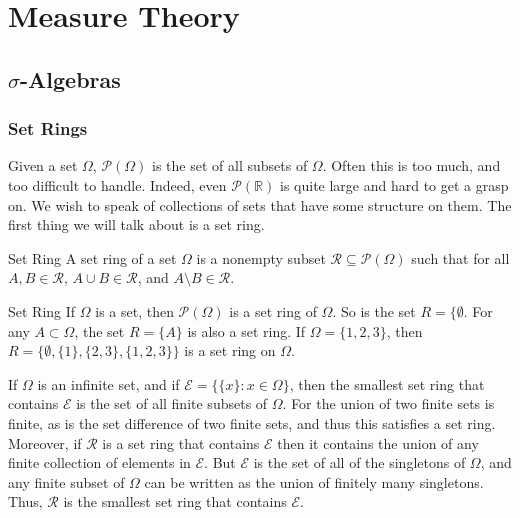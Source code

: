 \chapter{Measure Theory}
    \section{\texorpdfstring{$\sigma$}{Sigma}-Algebras}
        \subsection{Set Rings}
            Given a set $\Omega$, $\mathcal{P}(\Omega)$ is the
            set of all subsets of $\Omega$. Often this is too
            much, and too difficult to handle. Indeed, even
            $\mathcal{P}(\mathbb{R})$ is quite large and hard
            to get a grasp on. We wish to speak of collections
            of sets that have some structure on them.
            The first thing we will talk about is a set ring.
            \begin{ldefinition}{Set Ring}
                A set ring of a set $\Omega$ is a nonempty subset
                $\mathcal{R}\subseteq\mathcal{P}(\Omega)$ such that
                for all $A,B\in\mathcal{R}$,
                $A\cup{B}\in\mathcal{R}$, and
                $A\setminus{B}\in\mathcal{R}$.
            \end{ldefinition}
            \begin{example}{Set Ring}
                If $\Omega$ is a set, then
                $\mathcal{P}(\Omega)$ is a set ring of
                $\Omega$. So is the set $R=\{\emptyset$.
                For any $A\subset\Omega$, the set
                $R=\{A\}$ is also a set ring. If
                $\Omega=\{1,2,3\}$, then
                $R=\{\emptyset,\{1\},\{2,3\},\{1,2,3\}\}$ is
                a set ring on $\Omega$.
            \end{example}
            \begin{lexample}
                If $\Omega$ is an infinite set, and if
                $\mathcal{E}=\big\{\{x\}:x\in\Omega\big\}$, then the
                smallest set ring that contains $\mathcal{E}$ is the set of
                all finite subsets of $\Omega$. For the union of two finite
                sets is finite, as is the set difference of two finite sets,
                and thus this satisfies a set ring. Moreover, if $\mathcal{R}$
                is a set ring that contains $\mathcal{E}$ then it contains the
                union of any finite collection of elements in $\mathcal{E}$.
                But $\mathcal{E}$ is the set of all of the singletons of
                $\Omega$, and any finite subset of $\Omega$ can be written
                as the union of finitely many singletons. Thus, $\mathcal{R}$
                is the smallest set ring that contains $\mathcal{E}$.
            \end{lexample}
